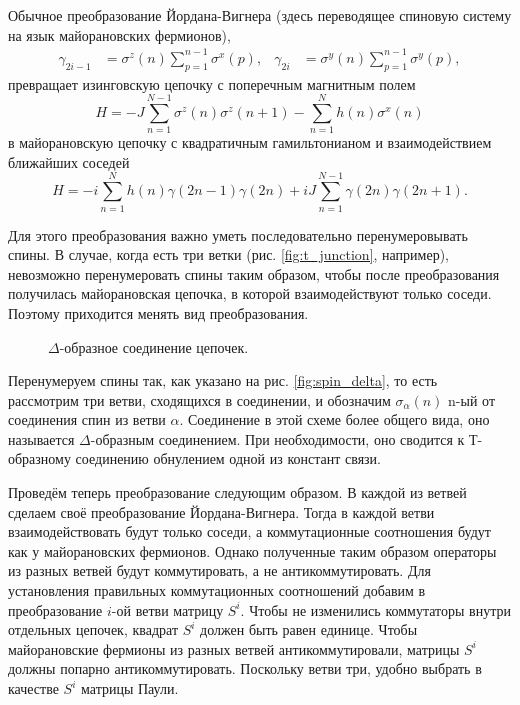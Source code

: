 \documentclass[a4paper,12pt]{article}
\theoremstyle{plain} %
\theoremstyle{definition} %
\theoremstyle{remark} %
\begin{document}
Обычное преобразование Йордана-Вигнера (здесь переводящее спиновую систему на язык майорановских фермионов),
\begin{align}
\gamma_{2i-1} &= \sigma^z (n) \sum\limits_{p=1}^{n-1} \sigma^x (p), & 
\gamma_{2i} &= \sigma^y (n) \sum\limits_{p=1}^{n-1} \sigma^y (p),
\end{align}
превращает изинговскую цепочку с поперечным магнитным полем
\begin{equation}
H = - J \sum\limits_{n=1}^{N-1} \sigma^z(n) \sigma^z(n+1) - \sum\limits_{n=1}^N h(n) \sigma^x(n)
\label{eq:spin_H}
\end{equation}
в майорановскую цепочку с квадратичным гамильтонианом и взаимодействием ближайших соседей
\begin{equation}
H = -i \sum\limits_{n=1}^N h(n) \gamma(2n-1) \gamma(2n) + i J \sum\limits_{n=1}^{N-1} \gamma(2n) \gamma(2n+1).
\end{equation}

Для этого преобразования важно уметь последовательно перенумеровывать спины. В случае, когда есть три ветки (рис. \ref{fig:t_junction}, например), невозможно перенумеровать спины таким образом, чтобы после преобразования получилась майорановская цепочка, в которой взаимодействуют только соседи. Поэтому приходится менять вид преобразования.

\begin{figure}
    \centering
    \captionsetup{width=0.45\textwidth}
    \caption{$\Delta$-образное соединение цепочек.}
\end{figure}

Перенумеруем спины так, как указано на рис. \ref{fig:spin_delta}, то есть рассмотрим три ветви, сходящихся в соединении, и обозначим $\sigma_\alpha (n)$ n-ый от соединения спин из ветви $\alpha$. Соединение в этой схеме более общего вида, оно называется $\Delta$-образным соединением. При необходимости, оно сводится к Т-образному соединению обнулением одной из констант связи.

Проведём теперь преобразование следующим образом. В каждой из ветвей сделаем своё преобразование Йордана-Вигнера. Тогда в каждой ветви взаимодействовать будут только соседи, а коммутационные соотношения будут как у майорановских фермионов. Однако полученные таким образом операторы из разных ветвей будут коммутировать, а не антикоммутировать. Для установления правильных коммутационных соотношений добавим в преобразование $i$-ой ветви матрицу $S^i$. Чтобы не изменились коммутаторы внутри отдельных цепочек, квадрат $S^i$ должен быть равен единице. Чтобы майорановские фермионы из разных ветвей антикоммутировали, матрицы $S^i$ должны попарно антикоммутировать. Поскольку ветви три, удобно выбрать в качестве $S^i$ матрицы Паули.
\end{document}
